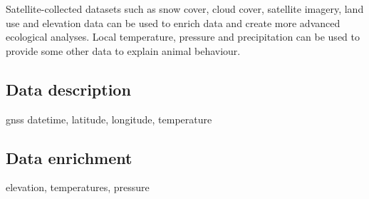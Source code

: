 Satellite-collected datasets such as snow cover, cloud cover, satellite imagery, land use and elevation data can be used to enrich data and create more advanced ecological analyses. Local temperature, pressure and precipitation can be used to provide some other data to explain animal behaviour.

\subsection{Data description}

gnss datetime, latitude, longitude, temperature

\subsection{Data enrichment}

elevation, temperatures, pressure
